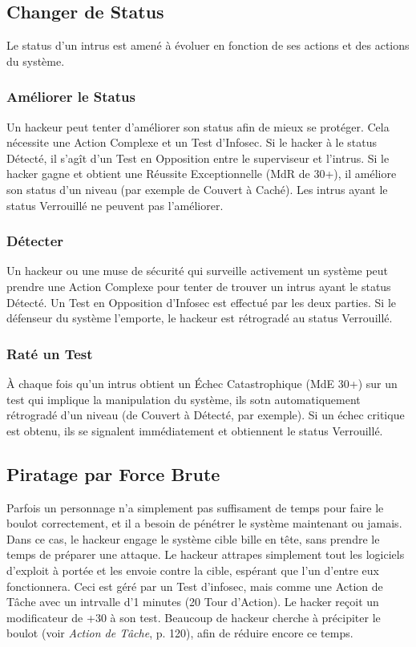 \subsection{Changer de Status} 

Le status d'un intrus est amené à évoluer en fonction de ses actions et des actions du système. 

\subsubsection{Améliorer le Status} 

Un hackeur peut tenter d'améliorer son status afin de mieux se protéger. Cela nécessite une Action Complexe et un Test d'Infosec. Si le hacker à le status Détecté, il s'agît d'un Test en Opposition entre le superviseur et l'intrus. Si le hacker gagne et obtient une Réussite Exceptionnelle (MdR de 30+), il améliore son status d'un niveau (par exemple de Couvert à Caché). Les intrus ayant le status Verrouillé ne peuvent pas l'améliorer. 

\subsubsection{Détecter} 

Un hackeur ou une muse de sécurité qui surveille activement un système peut prendre une Action Complexe pour tenter de trouver un intrus ayant le status Détecté. Un Test en Opposition d'Infosec est effectué par les deux parties. Si le défenseur du système l'emporte, le hackeur est rétrogradé au status Verrouillé. 

\subsubsection{Raté un Test} 

À chaque fois qu'un intrus obtient un Échec Catastrophique (MdE 30+) sur un test qui implique la manipulation du système, ils sotn automatiquement rétrogradé d'un niveau (de Couvert à Détecté, par exemple). Si un échec critique est obtenu, ils se signalent immédiatement et obtiennent le status Verrouillé. 

\subsection{Piratage par Force Brute} 

Parfois un personnage n'a simplement pas suffisament de temps pour faire le boulot correctement, et il a besoin de pénétrer le système maintenant ou jamais. Dans ce cas, le hackeur engage le système cible bille en tête, sans prendre le temps de préparer une attaque. Le hackeur attrapes simplement tout les logiciels d'exploit à portée et les envoie contre la cible, espérant que l'un d'entre eux fonctionnera. Ceci est géré par un Test d'infosec, mais comme une Action de Tâche avec un intrvalle d'1 minutes (20 Tour d'Action). Le hacker reçoit un modificateur de +30 à son test. Beaucoup de hackeur cherche à précipiter le boulot (voir \textit{Action de Tâche}, p. 120), afin de réduire encore ce temps. 

